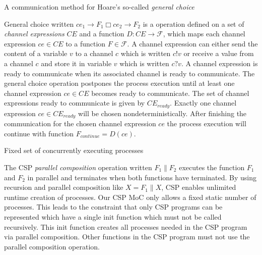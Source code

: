 \begin{characteristic}\label{characteristic-csp-general-choice}
  A communication method for Hoare's so-called \emph{general choice}
  
  General choice written $ce_{1} \to F_1 \Box ce_{2} \to F_2$
  is a operation defined on a set of \emph{channel expressions} $CE$ and
  a function $D: CE \to \mathcal{F}$, which maps each channel expression
  $ce \in CE$ to a function $F \in \mathcal{F}$. A channel
  expression can either send the content of a variable $v$ to
  a channel $c$ which is written $c!v$ or receive a value from
  a channel $c$ and store it in variable $v$ which is written
  $c?v$. A channel expression is ready to communicate when its
  associated channel is ready to communicate.
  The general choice operation postpones the process execution 
  until at least one channel expression $ce \in CE$
  becomes ready to communicate. The set of channel expressions
  ready to communicate is given by $CE_{ready}$.
  Exactly one channel expression $ce \in CE_{ready}$
  will be chosen nondeterministically. After
  finishing the communication for the chosen channel expression $ce$
  the process execution will continue
  with function $F_{continue} = D(ce)$.

\end{characteristic}

\begin{characteristic}\label{characteristic-csp-concurrent-processes}
  Fixed set of concurrently executing processes
  
  The CSP \emph{parallel composition} operation written $F_1 \| F_2$ executes the
  function $F_1$ and $F_2$ in parallel and terminates when both functions
  have terminated. By using recursion and parallel composition
  like $X = F_1 \| X$, CSP enables unlimited runtime creation of processes.
  Our CSP MoC only allows a fixed static number of processes. This
  leads to the constraint that only CSP programs can be represented which
  have a single init function which must not be called recursively. This init
  function creates all processes needed in the CSP program via parallel composition.
  Other functions in the CSP program must not use the parallel composition
  operation.
\end{characteristic}

%  

